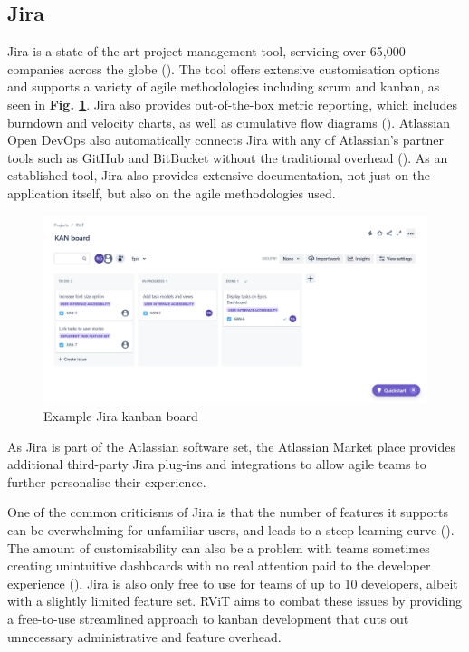 \documentclass[l4proj.tex]{subfiles}
\begin{document}
\subsection{Jira}
Jira is a state-of-the-art project management tool, servicing over 65,000 companies across the globe (\cite{JiraUsers}). The tool offers extensive customisation options and supports a variety of agile methodologies including scrum and kanban, as seen in \textbf{Fig. \ref{fig:Jira kanban}}.
Jira also provides out-of-the-box metric reporting, which includes burndown and velocity charts, as well as cumulative flow diagrams (\cite{JiraReports}). Atlassian Open DevOps also automatically connects Jira with any of Atlassian's partner tools such as GitHub and BitBucket without the traditional overhead (\cite{JiraDevOps}). As an established tool, Jira also provides extensive documentation, not just on the application itself, but also on the agile methodologies used.

\begin{figure}[h!]
\begin{center}
\includegraphics[scale=0.32]{dissertation/images/JiraKanbanBoard.png}
\caption{Example Jira kanban board}
\label{fig:Jira kanban} 
\end{center}
\end{figure}

As Jira is part of the Atlassian software set, the Atlassian Market place provides additional third-party Jira plug-ins and integrations to allow agile teams to further personalise their experience.  

One of the common criticisms of Jira is that the number of features it supports can be overwhelming for unfamiliar users, and leads to a steep learning curve (\cite{JiraProblemsFeatures}). The amount of customisability can also be a problem with teams sometimes creating unintuitive dashboards with no real attention paid to the developer experience (\cite{JiraProblemsFlexible}). Jira is also only free to use for teams of up to 10 developers, albeit with a slightly limited feature set. RViT aims to combat these issues by providing a free-to-use streamlined approach to kanban development that cuts out unnecessary administrative and feature overhead.
\end{document}

